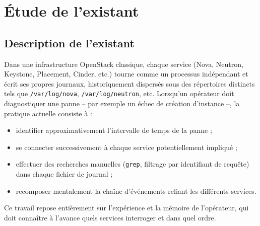\documentclass[a4paper,11pt,oneside]{report}
\begin{document}
\section{Étude de l'existant}

\subsection{Description de l'existant}
Dans une infrastructure OpenStack classique, chaque service (Nova, Neutron, Keystone, Placement, Cinder, etc.) tourne comme un processus indépendant et écrit ses propres journaux, historiquement dispersés sous des répertoires distincts tels que \texttt{/var/log/nova}, \texttt{/var/log/neutron}, etc. Lorsqu'un opérateur doit diagnostiquer une panne -- par exemple un échec de création d'instance --, la pratique actuelle consiste à :
\begin{itemize}
    \item identifier approximativement l'intervalle de temps de la panne ;
    \item se connecter successivement à chaque service potentiellement impliqué ;
    \item effectuer des recherches manuelles (\texttt{grep}, filtrage par identifiant de requête) dans chaque fichier de journal ;
    \item recomposer mentalement la chaîne d'événements reliant les différents services.
\end{itemize}
Ce travail repose entièrement sur l'expérience et la mémoire de l'opérateur, qui doit connaître à l'avance quels services interroger et dans quel ordre.
\end{document}
